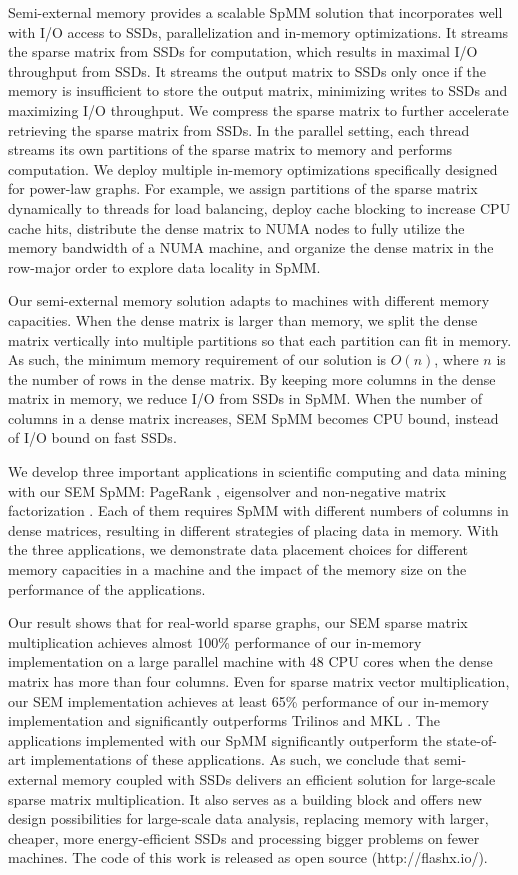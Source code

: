 Semi-external memory provides a scalable SpMM solution that incorporates well
with I/O access to SSDs, parallelization and in-memory optimizations.
It streams the sparse matrix from SSDs for computation, which results in maximal
I/O throughput from SSDs. It streams the output matrix to SSDs only once if
the memory is insufficient to store the output matrix, minimizing writes to
SSDs and maximizing I/O throughput.
We compress the sparse matrix to further accelerate retrieving the sparse
matrix from SSDs. In the parallel setting, each thread streams its own partitions
of the sparse matrix to memory and performs computation.
We deploy multiple in-memory optimizations specifically designed for power-law
graphs. For example, we assign partitions of the sparse matrix dynamically to
threads for load balancing, deploy cache blocking to increase CPU cache hits,
distribute the dense matrix to NUMA nodes to fully utilize the memory
bandwidth of a NUMA machine, and organize the dense matrix in the row-major order
to explore data locality in SpMM.

Our semi-external memory solution adapts to machines with different memory
capacities. When the dense matrix is larger than memory, we split the dense
matrix vertically into multiple partitions so that each partition can fit in
memory. As such, the minimum memory requirement of our solution is $O(n)$,
where $n$ is the number of rows in the dense matrix. By keeping more columns
in the dense matrix in memory, we reduce I/O from SSDs in SpMM. When the number
of columns in a dense matrix increases, SEM SpMM becomes CPU bound, instead of
I/O bound on fast SSDs.

We develop three important applications in scientific computing and data mining
with our SEM SpMM: PageRank \cite{pagerank}, eigensolver \cite{anasazi} and
non-negative matrix factorization \cite{nmf}. Each of them requires SpMM with
different numbers of columns in dense matrices, resulting in different
strategies of placing data in memory. With the three applications, we
demonstrate data placement choices for different memory capacities in a machine
and the impact of the memory size on the performance of the applications.


Our result shows that for real-world sparse graphs, our SEM sparse matrix
multiplication achieves almost 100\% performance of our in-memory implementation
on a large parallel machine with 48 CPU cores
when the dense matrix has more than four columns. Even for sparse matrix vector
multiplication, our SEM implementation achieves at least 65\% performance of
our in-memory implementation and significantly outperforms Trilinos \cite{trilinos}
and MKL \cite{mkl}. The applications implemented with our SpMM significantly
outperform the state-of-art implementations of these applications. As such,
we conclude that semi-external memory coupled with SSDs delivers an efficient
solution for large-scale sparse matrix multiplication. It also serves
as a building block and offers new design possibilities for large-scale
data analysis, replacing memory with larger, cheaper, more energy-efficient SSDs
and processing bigger problems on fewer machines. The code of this work is
released as open source (http://flashx.io/).
